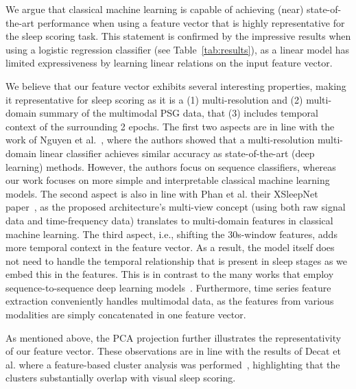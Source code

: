 \documentclass[runningheads]{llncs}
\begin{document}
We argue that classical machine learning is capable of achieving (near) state-of-the-art performance when using a feature vector that is highly representative for the sleep scoring task. This statement is confirmed by the impressive results when using a logistic regression classifier (see Table~\ref{tab:results}), as a linear model has limited expressiveness by learning linear relations on the input feature vector.

We believe that our feature vector exhibits several interesting properties, making it representative for sleep scoring as it is a (1) multi-resolution and (2) multi-domain summary of the multimodal PSG data, that (3) includes temporal context of the surrounding 2 epochs. 
The first two aspects are in line with the work of Nguyen et al.~\cite{le2019interpretable_ts_linear}, where the authors showed that a multi-resolution multi-domain linear classifier achieves similar accuracy as state-of-the-art (deep learning) methods. However, the authors focus on sequence classifiers, whereas our work focuses on more simple and interpretable classical machine learning models. The second aspect is also in line with Phan et al. their XSleepNet paper~\cite{phan2021xsleepnet}, as the proposed architecture's multi-view concept (using both raw signal data and time-frequency data) translates to multi-domain features in classical machine learning.
The third aspect, i.e., shifting the 30s-window features, adds more temporal context in the feature vector. As a result, the model itself does not need to handle the temporal relationship that is present in sleep stages as we embed this in the features. This is in contrast to the many works that employ sequence-to-sequence deep learning models~\cite{phan2020towards}.
Furthermore, time series feature extraction conveniently handles multimodal data, as the features from various modalities are simply concatenated in one feature vector.

As mentioned above, the PCA projection further illustrates the representativity of our feature vector.
These observations are in line with the results of Decat et al. where a feature-based cluster analysis was performed~\cite{decat2022beyond}, highlighting that the clusters substantially overlap with visual sleep scoring.
\end{document}

